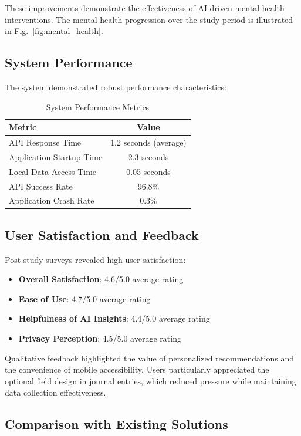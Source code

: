 \documentclass[conference,10pt]{IEEEtran}
\begin{document}
These improvements demonstrate the effectiveness of AI-driven mental health interventions. The mental health progression over the study period is illustrated in Fig.~\ref{fig:mental_health}.

\subsection{System Performance}

The system demonstrated robust performance characteristics:

\begin{table}[h]
\centering
\caption{System Performance Metrics}
\begin{tabular}{lc}
\toprule
\textbf{Metric} & \textbf{Value} \\
\midrule
API Response Time & 1.2 seconds (average) \\
Application Startup Time & 2.3 seconds \\
Local Data Access Time & 0.05 seconds \\
API Success Rate & 96.8\% \\
Application Crash Rate & 0.3\% \\
\bottomrule
\end{tabular}
\end{table}

\subsection{User Satisfaction and Feedback}

Post-study surveys revealed high user satisfaction:

\begin{itemize}
\item \textbf{Overall Satisfaction}: 4.6/5.0 average rating
\item \textbf{Ease of Use}: 4.7/5.0 average rating
\item \textbf{Helpfulness of AI Insights}: 4.4/5.0 average rating
\item \textbf{Privacy Perception}: 4.5/5.0 average rating
\end{itemize}

Qualitative feedback highlighted the value of personalized recommendations and the convenience of mobile accessibility. Users particularly appreciated the optional field design in journal entries, which reduced pressure while maintaining data collection effectiveness.

\subsection{Comparison with Existing Solutions}
\end{document}
